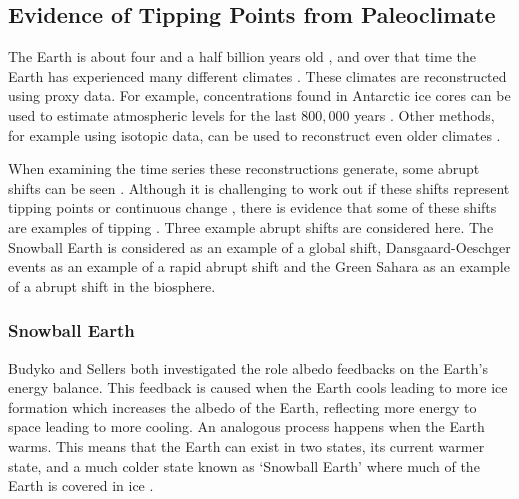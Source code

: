 \subsection{Evidence of Tipping Points from Paleoclimate}
The Earth is about four and a half billion years old \parencite{Dalrymple2001}, and over that time the Earth has experienced many different climates \parencite{Alley2003}.
These climates are reconstructed using proxy data. For example,  concentrations found in Antarctic ice cores can be used to estimate atmospheric  levels for the
last $800,000$ years \parencite{Bereiter2015}. Other methods, for example using isotopic data, can be used to reconstruct even older climates \parencite{Tierney2020}.

When examining the time series these reconstructions generate, some abrupt shifts can be seen \parencite{Boers2022,Brovkin2021}. Although it is challenging to work out if these
shifts represent tipping points or continuous change \parencite{Brovkin2008}, there is evidence that some of these shifts are examples of tipping \parencite{Dakos2008}. Three example abrupt shifts are considered here.
The Snowball Earth is considered as an example of a global shift, Dansgaard-Oeschger events as an example of a rapid abrupt shift and the Green Sahara as an example of a abrupt shift in
the biosphere.

\subsubsection{Snowball Earth}
Budyko and Sellers \parencite{Budyko1969,Sellers1969} both investigated the role albedo feedbacks on the Earth's energy balance. This feedback is caused when the Earth cools leading to more
ice formation which increases the albedo of the Earth, reflecting more energy to space leading to more cooling. An analogous process happens when the Earth warms. This means that the
Earth can exist in two states, its current warmer state, and a much colder state known as `Snowball Earth' where much of the Earth is covered in ice \parencite{Ghil1976,Held1974}. 

